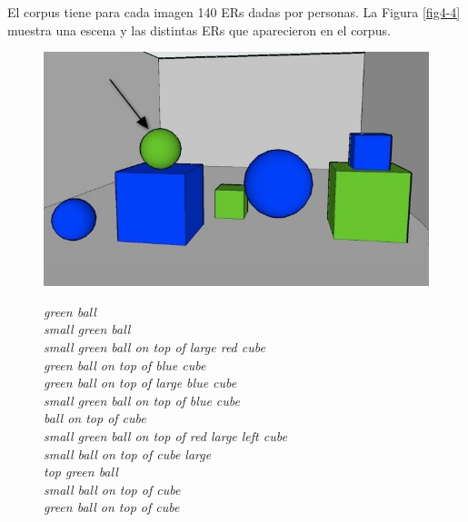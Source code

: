 El corpus tiene para cada imagen 140 ERs dadas por personas. La Figura \ref{fig4-4} muestra una escena y las distintas ERs que aparecieron en el corpus.
\begin{figure}[h]
\begin{minipage}[b]{0.5\linewidth}
\centering
\includegraphics[width=\textwidth]{images/3.jpg}
\end{minipage}
\hspace*{1cm}
\begin{minipage}[b]{0.5\linewidth}
\footnotesize{
{\it green ball} \\
{\it small green ball}  \\
{\it small green ball on top of large red cube} \\
{\it green ball on top of blue cube}\\
{\it green ball on top of large blue cube} \\
{\it small green ball on top of blue cube}  \\
{\it ball on top of cube} \\
{\it small green ball on top of red large left cube}  \\
{\it small ball on top of cube large}  \\
{\it top green ball}   \\
{\it small ball on top of cube } \\
{\it green ball on top of cube }

}
\end{minipage}
\end{figure}

